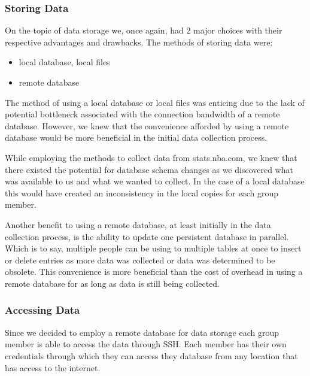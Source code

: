 \subsubsection{Storing Data}
On the topic of data storage we, once again, had 2 major choices with their respective advantages and drawbacks. The methods of storing data were:
\begin{itemize}
\item local database, local files
\item remote database
\end{itemize}
The method of using a local database or local files was enticing due to the lack of potential bottleneck associated with the connection bandwidth of a remote database. However, we knew that the convenience afforded by using a remote database would be more beneficial in the initial data collection process.

While employing the methods to collect data from stats.nba.com, we knew that there existed the potential for database schema changes as we discovered what was available to us and what we wanted to collect. In the case of a local database this would have created an inconsistency in the local copies for each group member. 

Another benefit to using a remote database, at least initially in the data collection process, is the ability to update one persistent database in parallel. Which is to say, multiple people can be using to multiple tables at once to insert or delete entries as more data was collected or data was determined to be obsolete. This convenience is more beneficial than the cost of overhead in using a remote database for as long as data is still being collected. 


\subsubsection{Accessing Data}

Since we decided to employ a remote database for data storage each group member is able to access the data through SSH. Each member has their own credentials through which they can access they database from any location that has access to the internet.


